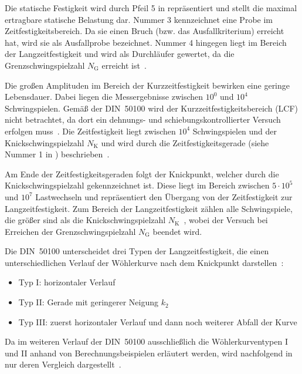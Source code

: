 Die statische Festigkeit wird durch Pfeil 5 in  repräsentiert und stellt die maximal ertragbare statische Belastung dar. Nummer 3 kennzeichnet eine Probe im Zeitfestigkeitsbereich. Da sie einen Bruch (bzw. das Ausfallkriterium) erreicht hat, wird sie als Ausfallprobe bezeichnet. Nummer 4 hingegen liegt im Bereich der Langzeitfestigkeit und wird als Durchläufer gewertet, da die Grenzschwingspielzahl $N_{\text{G}}$ erreicht ist~\cite[Seite~9]{DIN50100}.

Die großen Amplituden im Bereich der Kurzzeitfestigkeit bewirken eine geringe Lebensdauer. Dabei liegen die Messergebnisse zwischen $10^{0}$ und $10^{4}$ Schwingspielen. Gemäß der DIN~50100 wird der Kurzzeitfestigkeitsbereich (LCF) nicht betrachtet, da dort ein dehnungs- und schiebungskontrollierter Versuch erfolgen muss~\cite[Seite~9]{DIN50100}. Die Zeitfestigkeit liegt zwischen $10^{4}$ Schwingspielen und der Knickschwingspielzahl $N_{\text{K}}$ und wird durch die Zeitfestigkeitsgerade (siehe Nummer 1 in ) beschrieben~\cite[Seite~15--16]{DIN50100}.

Am Ende der Zeitfestigkeitsgeraden folgt der Knickpunkt, welcher durch die Knickschwingspielzahl gekennzeichnet ist. Diese liegt im Bereich zwischen $5 \cdot 10^5$ und $10^7$ Lastwechseln und repräsentiert den Übergang von der Zeitfestigkeit zur Langzeitfestigkeit.
Zum Bereich der Langzeitfestigkeit zählen alle Schwingspiele, die größer sind als die Knickschwingspielzahl $N_{\text{K}}$~\cite[Seite~15--16]{DIN50100}, wobei der Versuch bei Erreichen der Grenzschwingspielzahl $N_{\text{G}}$ beendet wird.

Die DIN~50100 unterscheidet drei Typen der Langzeitfestigkeit, die einen unterschiedlichen Verlauf der Wöhlerkurve nach dem Knickpunkt darstellen~\cite[Seite~18]{DIN50100}:

\begin{itemize}
    \item {Typ I: horizontaler Verlauf}
    \item {Typ II: Gerade mit geringerer Neigung $k_2$}
  \item {Typ III: zuerst horizontaler Verlauf und dann noch weiterer Abfall der Kurve}
\end{itemize}
  
  Da im weiteren Verlauf der DIN~50100 ausschließlich die Wöhlerkurventypen I und II anhand von Berechnungsbeispielen erläutert werden, wird nachfolgend in   nur deren Vergleich dargestellt~\cite[Seite~104--107]{DIN50100}.
    
